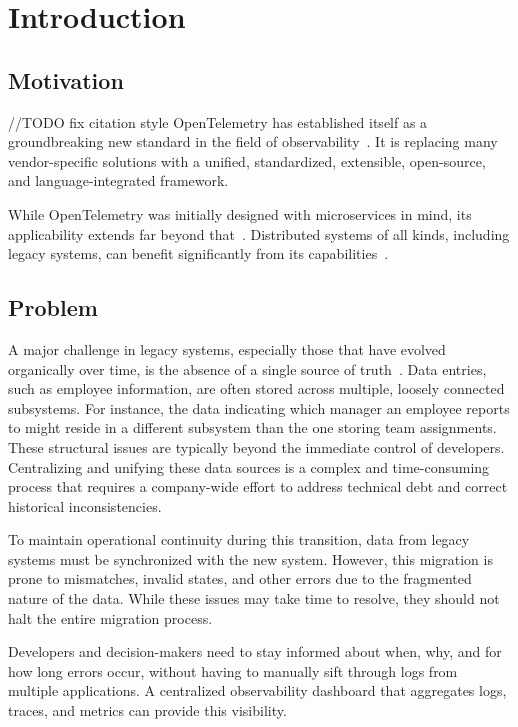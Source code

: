 \chapter{Introduction}
\label{chap:introduction}

\section{Motivation}
\label{sec:i_motivation}
//TODO fix citation style
OpenTelemetry has established itself as a groundbreaking new standard in the field of observability~\cite{Young2024, Young2021}.
It is replacing many vendor-specific solutions with a unified, standardized, extensible, open-source, 
and language-integrated framework.

While OpenTelemetry was initially designed with microservices in mind, its applicability extends far beyond that~\cite{Boten2022}.
Distributed systems of all kinds, including legacy systems, can benefit significantly from its capabilities~\cite{Gomez_Blanco2023}.

\section{Problem}
\label{sec:i_problem}

A major challenge in legacy systems, especially those that have evolved organically over time,
is the absence of a single source of truth~\cite{Flanders2024}.
Data entries, such as employee information, are often stored across multiple, loosely connected subsystems.
For instance, the data indicating which manager an employee reports to might reside in a
different subsystem than the one storing team assignments.
These structural issues are typically beyond the immediate control of developers.
Centralizing and unifying these data sources is a complex and time-consuming process
that requires a company-wide effort to address technical debt and correct historical inconsistencies.

To maintain operational continuity during this transition, data from legacy systems must be synchronized with the new system.
However, this migration is prone to mismatches, invalid states, and other errors due to the fragmented nature of the data.
While these issues may take time to resolve, they should not halt the entire migration process.

Developers and decision-makers need to stay informed about when, why, and for how long errors
occur, without having to manually sift through logs from multiple applications.
A centralized observability dashboard that aggregates logs, traces, and metrics can provide this visibility.

